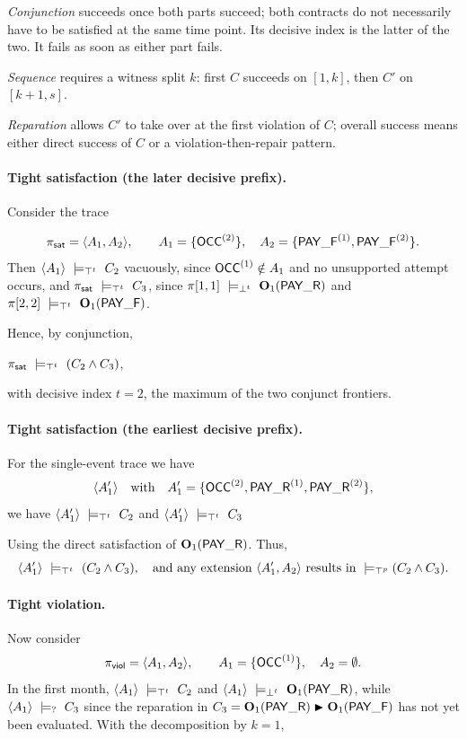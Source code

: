 \emph{Conjunction} succeeds once both parts succeed; both contracts do not necessarily have to be satisfied at the same time point. Its decisive index is the latter of the two. It fails as soon as either part fails.



\emph{Sequence} requires a witness split $k$: first $C$ succeeds on $[1,k]$, then $C'$ on $[k{+}1,s]$.



\emph{Reparation} allows $C'$ to take over at the first violation of $C$; overall success means either direct success of $C$ or a violation-then-repair pattern.





    \paragraph{Tight satisfaction (the later decisive prefix).}

    Consider the trace

    \[
    \pi_{\textsf{sat}} = \langle A_1, A_2\rangle,
    \qquad
    A_1=\{\OCC^{(2)}\},\quad
    A_2=\{\PAYF^{(1)},\PAYF^{(2)}\}.
    \]
    Then
    $\trace{A_1}\ \satt\ C_2$
    vacuously, since $\OCC^{(1)}\notin A_1$ and no unsupported attempt occurs,
    and
    $\pi_{\textsf{sat}}\ \satt\ C_3$,
    since $\pi[1,1]\ \violt\ \obl[1]{\PAY}$ and
    $\pi[2,2]\ \satt\ \obl[1]{\PAYF}$.

    Hence, by conjunction,

    $\pi_{\textsf{sat}}\ \satt\ (C_2 \wedge C_3)$,

    with decisive index $t=2$, the maximum of the two conjunct frontiers.

    

    \paragraph{Tight satisfaction (the earliest decisive prefix).}

    For the single-event trace we have
    \[
    \trace{A_1'} \quad\text{with}\quad A_1'=\{\OCC^{(2)},\PAY^{(1)},\PAY^{(2)}\},
    \]
    we have
    $\trace{A_1'}\ \satt\ C_2$ and
  $\trace{A_1'}\ \satt\ C_3$

Using the direct satisfaction of $\obl[1]{\PAY}$.
    Thus,
    \[
    \trace{A_1'}\ \satt\ (C_2 \wedge C_3),
    \quad
    \text{and any extension }\trace{A_1',A_2}\text{ results in }\postsat(C_2\wedge C_3).
    \]
    \paragraph{Tight violation.}
    Now consider
    \[
    \pi_{\textsf{viol}} = \langle A_1, A_2\rangle,
    \qquad
    A_1=\{\OCC^{(1)}\},\quad
    A_2=\emptyset.
    \]
    In the first month,
    $\trace{A_1}\ \satt\ C_2$
 and $\trace{A_1}\ \violt\ \obl[1]{\PAY}$, while
    $\trace{A_1}\ \presat\ C_3$
 since the reparation in $C_3=\obl[1]{\PAY}\repair\obl[1]{\PAYF}$ has not yet been evaluated.
With the decomposition by $k=1$,

